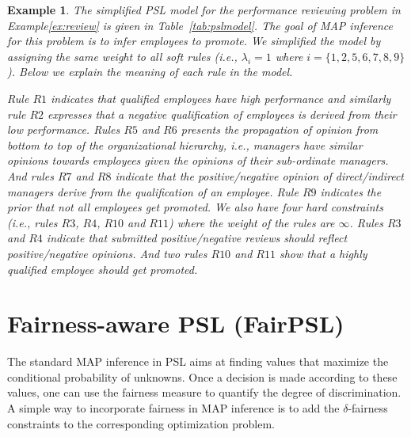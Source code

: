 \documentclass[11pt]{article}
\newtheorem{myex}{\textbf{Example}}
\begin{document}
\begin{myex}
\label{ex:pslmodel}
The simplified PSL model for the performance reviewing problem in Example\ref{ex:review} is given in Table~\ref{tab:pslmodel}. The goal of MAP inference for this problem is to infer employees to promote. We simplified the model by assigning the same weight to all soft rules (i.e., $\lambda_i= 1$ where $i=\{1,2,5,6,7,8,9\}$). Below we explain the meaning of each rule in the model.

Rule $R1$ indicates that qualified employees have high performance and similarly rule $R2$ expresses that a negative qualification of employees is derived from their low performance. Rules $R5$ and $R6$ presents the propagation of opinion from bottom to top of the organizational hierarchy, i.e., managers have similar opinions towards employees given the opinions of their sub-ordinate managers. And rules $R7$ and $R8$ indicate that the positive/negative opinion of direct/indirect managers derive from the qualification of an employee. Rule $R9$ indicates the prior that not all employees get promoted. We also have four hard constraints (i.e., rules $R3$, $R4$, $R10$ and $R11$) where the weight of the rules are $\infty$. Rules $R3$ and $R4$ indicate that submitted positive/negative reviews should reflect positive/negative opinions. And two rules $R10$ and $R11$ show that a highly qualified employee should get promoted. 
\end{myex}

\section{Fairness-aware PSL (FairPSL)}
\label{sec:fairMAP}

The standard MAP inference in PSL aims at finding values that maximize the conditional probability of unknowns. Once a decision is made according to these values, one can use the fairness measure to quantify the degree of discrimination. A simple way to incorporate fairness in MAP inference is to add the $\delta$-fairness constraints to the corresponding optimization problem.   
\end{document}
